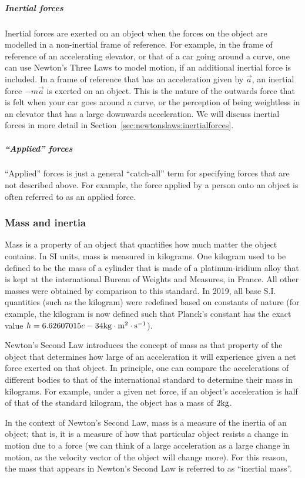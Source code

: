 \subparagraph{Inertial forces}

Inertial forces are exerted on an object when the forces on the object are modelled in a non-inertial frame of reference. For example, in the frame of reference of an accelerating elevator, or that of a car going around a curve, one can use Newton's Three Laws to model motion, if an additional inertial force is included. In a frame of reference that has an acceleration given by $\vec a$, an inertial force $-m\vec a$ is exerted on an object. This is the nature of the outwards force that is felt when your car goes around a curve, or the perception of being weightless in an elevator that has a large downwards acceleration. We will discuss inertial forces in more detail in Section~\ref{sec:newtonslaws:inertialforces}.

\subparagraph{``Applied'' forces}

``Applied'' forces is just a general ``catch-all'' term for specifying forces that are not described above. For example, the force applied by a person onto an object is often referred to as an applied force.

\subsubsection{Mass and inertia}

Mass is a property of an object that quantifies how much matter the object contains. In SI units, mass is measured in kilograms. One kilogram used to be defined to be the mass of a cylinder that is made of a platinum-iridium alloy that is kept at the international Bureau of Weights and Measures, in France. All other masses were obtained by comparison to this standard. In 2019, all base S.I. quantities (such as the kilogram) were redefined based on constants of nature (for example, the kilogram is now defined such that Planck's constant has the exact value $h=6.62607015e -34 {\rm kg\cdot m^2\cdot s^{ -1}}$).

Newton's Second Law introduces the concept of mass as that property of the object that determines how large of an acceleration it will experience given a net force exerted on that object. In principle, one can compare the accelerations of different bodies to that of the international standard to determine their mass in kilograms. For example, under a given net force, if an object's acceleration is half of that of the standard kilogram, the object has a mass of $2 {\rm kg}$.

In the context of Newton's Second Law, mass is a measure of the inertia of an object; that is, it is a measure of how that particular object resists a change in motion due to a force (we can think of a large acceleration as a large change in motion, as the velocity vector of the object will change more). For this reason, the mass that appears in Newton's Second Law is referred to as ``inertial mass''.

